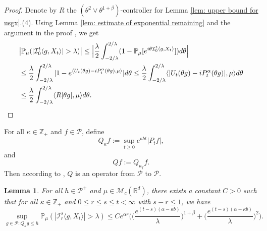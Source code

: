 \documentclass[12pt,a4paper]{amsart}
\theoremstyle{plain}
\newtheorem{lem}[thm]{Lemma}
\theoremstyle{definition}
\numberwithin{equation}{section}
\begin{document}
\begin{proof}
    Denote by $R$ the $(\theta^2\vee\theta^{1+\beta})$-controller for Lemma \ref{lem: upper bound for usgx}.(4).
    Using Lemma \ref{lem: estimate of exponential remaining} and the argument in the proof \cite[Theorem 3.3.6]{Durrett2010Probability}, we get
\begin{equation}\begin{split}
    &\big|\mathbb P_\mu (|\mathcal{I}_0^t\langle g,X_t\rangle| > \lambda)\big|
    \leq \Big|\frac{\lambda}{2}\int_{-2/\lambda}^{2/\lambda}(1 - \mathbb P_\mu[e^{i\theta \mathcal{I}_0^t\langle g,X_t\rangle}])d\theta\Big|
    \\&\leq \frac{\lambda}{2}\int_{-2/\lambda}^{2/\lambda}|1-e^{\langle U_t(\theta g)-iP^\alpha_t (\theta g),\mu \rangle}|d\theta
    \leq \frac{\lambda}{2}\int_{-2/\lambda}^{2/\lambda}\langle |U_t(\theta g) - iP^\alpha_t(\theta g)|,\mu\rangle d\theta
    \\&\leq \frac{\lambda}{2}\int_{-2/\lambda}^{2/\lambda}\langle R|\theta g|,\mu\rangle d\theta.
      \qedhere
\end{split}\end{equation}
\end{proof}
    For all $\kappa \in \mathbb Z_+$ and $f\in \mathcal P$, define
\begin{equation}\label{Q_k}
Q_\kappa f := \sup_{t\geq 0} e^{\kappa b t}|P_t f|,
\end{equation}
and
\begin{equation}\label{Q}
Q f:= Q_{\kappa_f}f.
\end{equation}
    Then according to \cite[Fact 1.2]{MM}, $Q$ is an operator from $\mathcal P$ to $\mathcal P$.
\begin{lem}\label{lem: temp}
    For all $h \in \mathcal P^+$ and $\mu \in \mathcal M_c(\mathbb R^d)$, there exists a constant $C > 0$ such that for all $\kappa \in \mathbb Z_+ $ and $0\leq r\leq s\leq t<\infty$ with $s-r \leq 1$, we have
\[
    \sup_{g \in \mathcal P: Q_\kappa g\leq h}\mathbb P_{\mu}(|\mathcal I_r^s\langle g, X_t\rangle|>\lambda)
    \leq C e^{\alpha r} \bigg(\Big( \frac{e^{(t-s)(\alpha - \kappa b)}}{\lambda}\Big)^{1+\beta} + \Big( \frac{e^{(t-s)(\alpha - \kappa b)}}{\lambda}\Big)^{2} \bigg).
\]
\end{lem}
\end{document}
